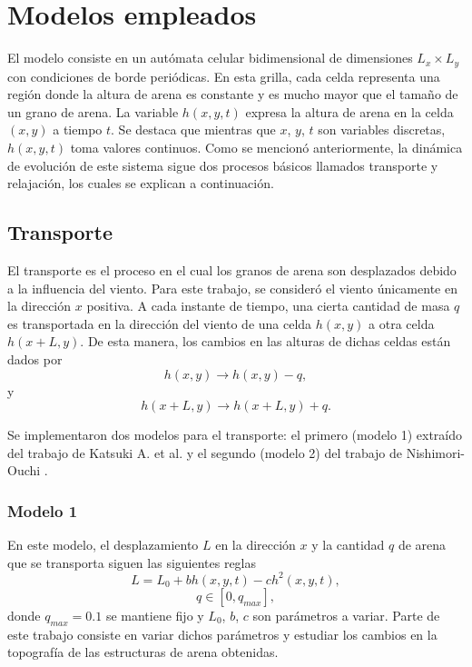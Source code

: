 \documentclass[11pt,twocolumn,twoside]{opticajnl}
\begin{document}
\section{Modelos empleados}

El modelo consiste en un autómata celular bidimensional de dimensiones $L_x\times L_y$ con condiciones de borde periódicas. En esta grilla, cada celda representa una región donde la altura de arena es constante y es mucho mayor que el tamaño de un grano de arena. La variable $h(x,y,t)$ expresa la altura de arena en la celda $(x,y)$ a tiempo $t$. Se destaca que mientras que $x$, $y$, $t$ son variables discretas, $h(x,y,t)$ toma valores continuos. Como se mencionó anteriormente, la dinámica de evolución de este sistema sigue dos procesos básicos llamados transporte y relajación, los cuales se explican a continuación. 

\subsection{Transporte}

El transporte es el proceso en el cual los granos de arena son desplazados debido a la influencia del viento. Para este trabajo, se consideró el viento únicamente en la dirección $x$ positiva. A cada instante de tiempo, una cierta cantidad de masa $q$ es transportada en la dirección del viento de una celda $h(x,y)$ a otra celda $h(x + L, y)$. De esta manera, los cambios en las alturas de dichas celdas están dados por
\begin{equation}
    h(x,y) \rightarrow h(x,y) - q,
\end{equation}
y 
\begin{equation}
    h(x+L,y) \rightarrow h(x+L,y) + q.
\end{equation}

Se implementaron dos modelos para el transporte: el primero (modelo 1) extraído del trabajo de Katsuki A. et al. \cite{katsuki_cellular_2011} y el segundo (modelo 2) del trabajo de Nishimori-Ouchi \cite{nishimori_formation_1993}. 

\subsubsection{Modelo 1}

En este modelo, el desplazamiento $L$ en la dirección $x$ y la cantidad $q$ de arena que se transporta siguen las siguientes reglas
\begin{equation}
    L = L_0 + bh(x,y,t) - ch^2(x,y,t),
    \label{ec:Lmodelo1}
\end{equation}
\begin{equation}
    q \in [0,q_{max}],
\end{equation}
donde $q_{max} = 0.1$ se mantiene fijo y $L_0$, $b$, $c$ son parámetros a variar. Parte de este trabajo consiste en variar dichos parámetros y estudiar los cambios en la topografía de las estructuras de arena obtenidas. 
\end{document}

